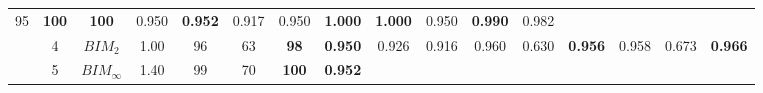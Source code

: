 \begin{table}[tph]
\begin{adjustbox}{angle=90}
{\begin{tabular}{c|c|cc|ccc|ccc|ccc|ccc}
                95
                                                                        &
                \textbf{100}
                                                                        &
                \textbf{100}
                                                                        & 0.950
                                                                        &
                \textbf{0.952}
                                                                        & 0.917
                                                                        & 0.950                          &
                \textbf{1.000}
                                                                        &
                \textbf{1.000}
                                                                        & 0.950
                                                                        &
                \textbf{0.990}
                                                                        & 0.982
                \\
                                                                        & 4
                                                                        & $BIM_{2}$                      & 1.00
                                                                        & 96                             & 63
                                                                        &
                \textbf{98}
                                                                        &
                \textbf{0.950}
                                                                        & 0.926
                                                                        & 0.916                          &
                0.960                                                   & 0.630
                                                                        &
                \textbf{0.956}
                                                                        & 0.958
                                                                        & 0.673                          &
                \textbf{0.966}
                \\
                                                                        & 5
                                                                        & $BIM_{\infty}$                 & 1.40 & 99 & 70
                                                                        &
                \textbf{100}
                                                                        &
                \textbf{0.952}

\end{tabular}}
\end{adjustbox}
\end{table}
